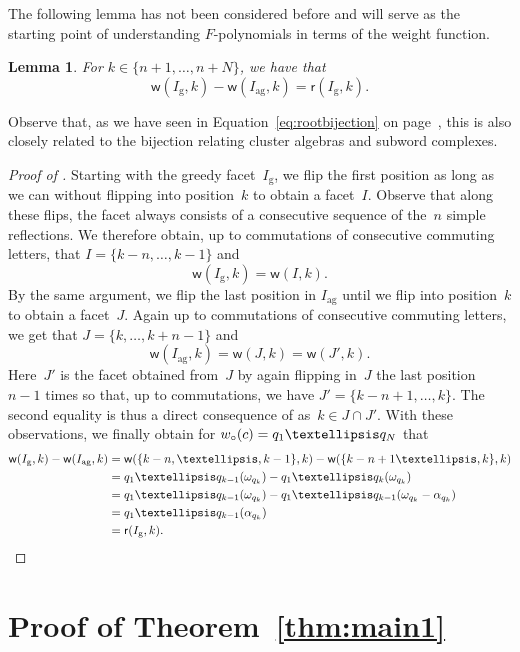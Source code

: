 \documentclass[10pt]{amsart}
\newtheorem{lemm}[theo]{Lemma}\newtheorem{prop}[theo]{Proposition}\newtheorem{coro}[theo]{Corollary}\newtheorem{conj}[theo]{Conjecture}
\theoremstyle{definition}\newtheorem{rema}[theo]{Remark}\newtheorem{exem}[theo]{Example}
\newcommand{\greedy}{I_{\operatorname{g}}}
\newcommand{\antigreedy}{I_{\operatorname{ag}}}
\newcommand{\sq}[1]{{\rm #1}}
\newcommand{\q}{\sq{q}}
\newcommand{\sfr}{\mathsf{r}}
\newcommand{\sfw}{\mathsf{w}}
\newcommand{\wo}{{w_\circ}}
\newcommand{\sw}[2]{\sq{#1}(\sq{#2})}
\newcommand{\cwo}[1]{\sw{\wo}{#1}}
\newcommand{\Root}[2]{{\sfr}(#1,#2)}
\newcommand{\Weight}[2]{{\sfw}(#1,#2)}
\begin{document}
The following lemma has not been considered before and will serve as the starting point of understanding $F$-polynomials in terms of the weight function.

\begin{lemm}\label{lem:rootlemma}
For $k \in \{n+1,\dots,n+N\}$, we have that
\[
\Weight{\greedy}{k} - \Weight{\antigreedy}{k} = \Root{\greedy}{k}.
\]
\end{lemm}

Observe that, as we have seen in Equation~\eqref{eq:rootbijection} on page~\pageref{eq:rootbijection}, this is also closely related to the bijection relating cluster algebras and subword complexes.

\begin{proof}[Proof of ]
Starting with the greedy facet~$\greedy$, we flip the first position as long as we can without flipping into position~$k$ to obtain a facet~$I$. Observe that along these flips, the facet always consists of a consecutive sequence of the~$n$ simple reflections. We therefore obtain, up to commutations of consecutive commuting letters, that $I = \{k-n,\dots,k-1\}$ and
\[
\Weight{\greedy}{k} = \Weight{I}{k}.
\]
By the same argument, we flip the last position in $\antigreedy$ until we flip into position~$k$ to obtain a facet~$J$. Again up to commutations of consecutive commuting letters, we get that $J = \{k,\dots,k+n-1\}$ and
\[
\Weight{\antigreedy}{k} = \Weight{J}{k} = \Weight{J'}{k}.
\]
Here~$J'$ is the facet obtained from~$J$ by again flipping in~$J$ the last position~$n-1$ times so that, up to commutations, we have $J' = \{k-n+1,\dots,k\}$. The second equality is thus a direct consequence of  as~$k \in J \cap J'$. With these observations, we finally obtain for $\cwo{c} = \q_1\dots\q_N$ that
\begin{align*}
\Weight{\greedy}{k} - \Weight{\antigreedy}{k} &= \Weight{\{k-n,\dots,k-1\}}{k} - \Weight{\{k-n+1\dots,k\}}{k} \\
&= q_1\dots q_{k-1}(\omega_{q_k}) - q_1\dots q_{k}(\omega_{q_k}) \\
&= q_1\dots q_{k-1}(\omega_{q_k}) - q_1\dots q_{k-1}(\omega_{q_k} - \alpha_{q_k}) \\
&= q_1\dots q_{k-1}(\alpha_{q_k}) \\
&= \Root{\greedy}{k}. \qedhere
\end{align*}
\end{proof}
\setcounter{section}{3}
\section{Proof of Theorem~\ref{thm:main1}}\label{sec:proofmain1}
\end{document}
